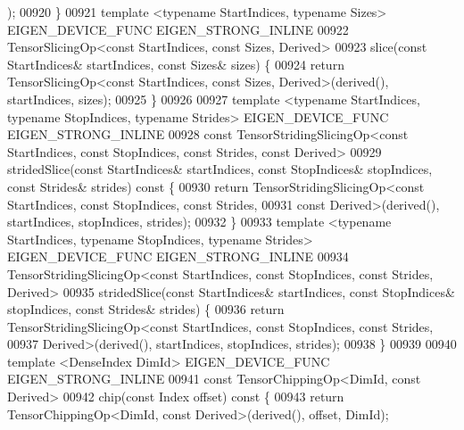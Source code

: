 \begin{DoxyCode}
      );
00920     \}
00921     \textcolor{keyword}{template} <\textcolor{keyword}{typename} StartIndices, \textcolor{keyword}{typename} Sizes> EIGEN\_DEVICE\_FUNC EIGEN\_STRONG\_INLINE
00922     TensorSlicingOp<const StartIndices, const Sizes, Derived>
00923     slice(\textcolor{keyword}{const} StartIndices& startIndices, \textcolor{keyword}{const} Sizes& sizes) \{
00924       \textcolor{keywordflow}{return} TensorSlicingOp<const StartIndices, const Sizes, Derived>(derived(), startIndices, sizes);
00925     \}
00926 
00927     \textcolor{keyword}{template} <\textcolor{keyword}{typename} StartIndices, \textcolor{keyword}{typename} StopIndices, \textcolor{keyword}{typename} Str\textcolor{keywordtype}{id}es> EIGEN\_DEVICE\_FUNC 
      EIGEN\_STRONG\_INLINE
00928     \textcolor{keyword}{const} TensorStridingSlicingOp<const StartIndices, const StopIndices, const Strides, const Derived>
00929     stridedSlice(\textcolor{keyword}{const} StartIndices& startIndices, \textcolor{keyword}{const} StopIndices& stopIndices, \textcolor{keyword}{const} Strides& strides)\textcolor{keyword}{
       const }\{
00930       \textcolor{keywordflow}{return} TensorStridingSlicingOp<\textcolor{keyword}{const} StartIndices, \textcolor{keyword}{const} StopIndices, \textcolor{keyword}{const} Strides,
00931                                 \textcolor{keyword}{const} Derived>(derived(), startIndices, stopIndices, strides);
00932     \}
00933     \textcolor{keyword}{template} <\textcolor{keyword}{typename} StartIndices, \textcolor{keyword}{typename} StopIndices, \textcolor{keyword}{typename} Str\textcolor{keywordtype}{id}es> EIGEN\_DEVICE\_FUNC 
      EIGEN\_STRONG\_INLINE
00934     TensorStridingSlicingOp<const StartIndices, const StopIndices, const Strides, Derived>
00935     stridedSlice(\textcolor{keyword}{const} StartIndices& startIndices, \textcolor{keyword}{const} StopIndices& stopIndices, \textcolor{keyword}{const} Strides& strides) 
      \{
00936       \textcolor{keywordflow}{return} TensorStridingSlicingOp<\textcolor{keyword}{const} StartIndices, \textcolor{keyword}{const} StopIndices, \textcolor{keyword}{const} Strides,
00937                                 Derived>(derived(), startIndices, stopIndices, strides);
00938     \}
00939 
00940     \textcolor{keyword}{template} <DenseIndex DimId> EIGEN\_DEVICE\_FUNC EIGEN\_STRONG\_INLINE
00941     \textcolor{keyword}{const} TensorChippingOp<DimId, const Derived>
00942     chip(\textcolor{keyword}{const} Index offset)\textcolor{keyword}{ const }\{
00943       \textcolor{keywordflow}{return} TensorChippingOp<DimId, const Derived>(derived(), offset, DimId);

\end{DoxyCode}
